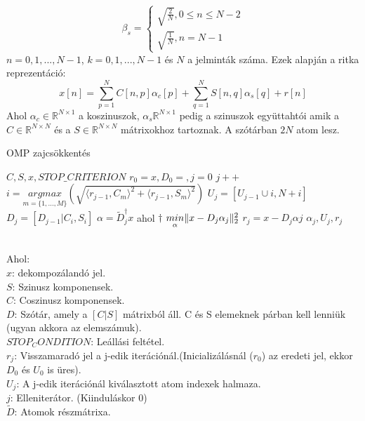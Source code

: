 \begin{equation}
    \beta_s = 
    \begin{cases}
        \sqrt{\frac{2}{N}}, 0 \leq n \leq N - 2\\
        \sqrt{\frac{1}{N}}, n = N - 1
    \end{cases}
\end{equation}
$n = {0, 1,..., N - 1}$, $k = {0, 1,..., N - 1}$ és $N$ a jelminták száma. Ezek alapján a ritka reprezentáció:
\begin{equation}
    x[n] = \sum_{p=1}^N C[n,p]\alpha_c[p] + \sum_{q=1}^N S[n,q]\alpha_s[q] + r[n]
\end{equation}
Ahol $\alpha_c \in \mathbb{R}^{N \times 1}$ a koszinuszok, $\alpha_s \mathbb{R}^{N \times 1}$ pedig a szinuszok együttahtói amik a $C \in \mathbb{R}^{N \times N}$ és a $S \in \mathbb{R}^{N \times N}$ mátrixokhoz tartoznak. A szótárban $2N$ atom lesz.\cite{noise_reduction_omp}
\\
\begin{algorithm}
    \caption{OMP zajcsökkentés}\label{alg:cap}
    \begin{algorithmic}
        \Require $C, S, x, STOP\_CRITERION$
        \Ensure $r_0 = x, D_0 = {}, j = 0$
            \State $j++$
            \State $i = \underset{m=\{1,...,M\}}{argmax}(\sqrt{\langle r_{j-1}, C_m \rangle^2 + \langle r_{j-1}, S_m \rangle^2})$  %
            \State $U_{j}=[U_{j - 1} \cup {i, N + i}]$
            \State $D_{j}=[D_{j - 1} | {C_{i}, S_i}]$
            \State $\alpha = \tilde{D}_j^{\dagger}x$ ahol $\dagger$
           \State $\underset{\alpha}{min} \lVert x - D_{j}\alpha_{j}\rVert_{2}^{2}$
          \State $r_{j} = x - D_{j}\alpha{j}$
       \EndWhile
       \State \Return $\alpha_{j}, U_{j}, r_{j}$
   \end{algorithmic} \cite{noise_reduction_omp} 
\end{algorithm}
\\
Ahol: \\
$x$: dekompozálandó jel. \\
$S$: Szinusz komponensek. \\
$C$: Coszinusz komponensek. \\
$D$: Szótár, amely a $[C|S]$ mátrixból áll. C és S elemeknek párban kell lenniük (ugyan akkora az elemszámuk).\\
$STOP_CONDITION$: Leállási feltétel. \\
$r_j$: Visszamaradó jel a j-edik iterációnál.(Inicializálásnál ($r_0$) az eredeti jel, ekkor $D_0$ és $U_0$ is üres). \\
$U_j$: A j-edik iterációnál kiválasztott atom indexek halmaza. \\
$j$: Elleniterátor. (Kiinduláskor 0) \\
$\tilde{D}$: Atomok részmátrixa. \\

